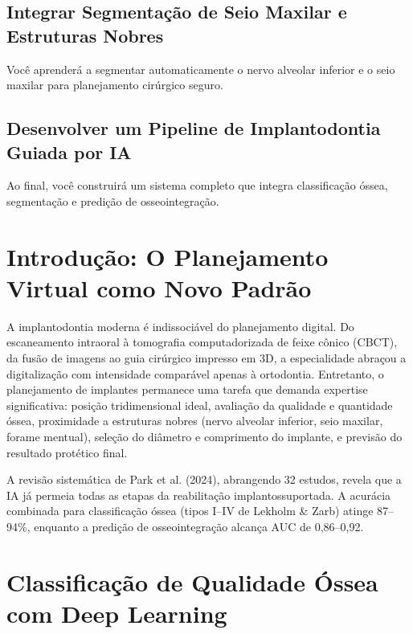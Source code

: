 \subsection{Integrar Segmentação de Seio Maxilar e Estruturas Nobres}
Você aprenderá a segmentar automaticamente o nervo alveolar inferior e o seio maxilar para planejamento cirúrgico seguro.

\subsection{Desenvolver um Pipeline de Implantodontia Guiada por IA}
Ao final, você construirá um sistema completo que integra classificação óssea, segmentação e predição de osseointegração.

\section{Introdução: O Planejamento Virtual como Novo Padrão}

A implantodontia moderna é indissociável do planejamento digital. Do escaneamento intraoral à tomografia computadorizada de feixe cônico (CBCT), da fusão de imagens ao guia cirúrgico impresso em 3D, a especialidade abraçou a digitalização com intensidade comparável apenas à ortodontia. Entretanto, o planejamento de implantes permanece uma tarefa que demanda expertise significativa: posição tridimensional ideal, avaliação da qualidade e quantidade óssea, proximidade a estruturas nobres (nervo alveolar inferior, seio maxilar, forame mentual), seleção do diâmetro e comprimento do implante, e previsão do resultado protético final.

A revisão sistemática de Park et al. (2024), abrangendo 32 estudos, revela que a IA já permeia todas as etapas da reabilitação implantossuportada. A acurácia combinada para classificação óssea (tipos I--IV de Lekholm \& Zarb) atinge 87--94\%, enquanto a predição de osseointegração alcança AUC de 0,86--0,92.


\section{Classificação de Qualidade Óssea com Deep Learning}

